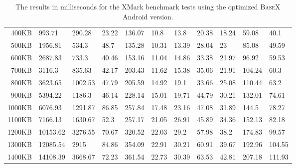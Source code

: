 \begin {table}[htpb]
\begin{tabular}{r|l|l|l|l|l|l|l|l|l|l}
400KB&993.71&290.28&23.22&136.07&10.8&13.8&20.38&18.24&59.08&40.1\\
500KB&1956.81&534.3&48.7&135.28&10.31&13.39&28.04&23&85.08&49.59\\
600KB&2687.83&733.3&40.46&153.16&11.04&14.86&33.38&21.97&96.92&59.53\\
700KB&3116.3&835.63&42.17&203.43&11.62&15.38&35.06&21.91&104.24&60.3\\
800KB&3623.65&1002.53&47.79&205.59&14.92&19.1&33.66&25.08&110.44&63.2\\
900KB&5394.22&1186.3&46.14&228.14&15.01&19.71&44.79&30.21&132.01&74.61\\
1000KB&6076.93&1291.87&86.85&257.84&17.48&23.16&47.08&31.89&144.5&78.27\\
1100KB&7166.13&1630.67&52.3&257.17&21.05&26.91&45.89&34.36&152.13&82.18\\
1200KB&10153.62&3276.55&70.67&320.52&22.03&29.2&57.98&38.2&174.83&99.57\\
1300KB&12085.54&2915&84.86&354.09&22.91&30.21&60.91&39.67&192.96&104.55\\
1400KB&14108.39&3668.67&72.23&361.54&22.73&30.39&63.53&42.81&207.18&111.93\\
\end{tabular}
\caption{The results in milliseconds for the XMark benchmark tests using the optimized \textsc{BaseX} Android version.}
\label{tab:xmark-tablet-optimized-appendice}
\end {table}

